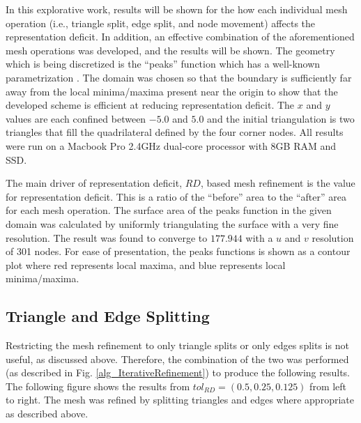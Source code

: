In this explorative work, results will be shown for the how each
individual mesh operation (i.e., triangle split, edge split, and node 
movement) affects the representation deficit. In addition, an effective
combination of the aforementioned mesh operations was developed, and the
results will be shown. The geometry which is being discretized is the
``peaks'' function which has a well-known parametrization
\cite{peaksMatlab}. The domain was chosen so that the boundary is
sufficiently far away from the local minima/maxima present near the origin to
show that the developed scheme is efficient at reducing representation
deficit. The $x$ and $y$ values are each confined between $-5.0$ and
$5.0$ and the initial triangulation is two triangles that fill the
quadrilateral defined by the four corner nodes. All results were run on
a Macbook Pro 2.4GHz dual-core processor with 8GB RAM and SSD.

The main driver of representation deficit, $RD$, based mesh refinement
is the value for representation deficit. This is a ratio of the
``before'' area to the ``after'' area for each mesh operation. The
surface area of the peaks function in the given domain was calculated by
uniformly triangulating the surface with a very fine resolution. The
result was found to converge to $177.944$ with a $u$ and $v$ resolution
of 301 nodes. For ease of presentation, the peaks functions is shown as
a contour plot where red represents local maxima, and blue represents
local minima/maxima.

\subsection{Triangle and Edge Splitting}
Restricting the mesh refinement to only triangle splits or only edges
splits is not useful, as discussed above. Therefore, the combination of
the two was performed (as described in Fig. \ref{alg_IterativeRefinement})
to produce the following results. The following figure shows the results
from $tol_{RD}=\left(0.5,0.25,0.125\right)$ from left to right. The mesh was
refined by splitting triangles and edges where appropriate as described
above.

